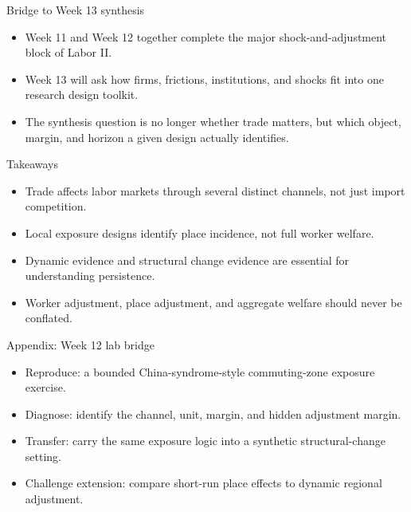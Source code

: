 \documentclass[aspectratio=169,11pt]{beamer}
\begin{document}
\begin{frame}{Bridge to Week 13 synthesis}
\begin{itemize}
    \item Week 11 and Week 12 together complete the major shock-and-adjustment block of Labor II.
    \item Week 13 will ask how firms, frictions, institutions, and shocks fit into one research design toolkit.
    \item The synthesis question is no longer whether trade matters, but which object, margin, and horizon a given design actually identifies.
\end{itemize}
\end{frame}

\begin{frame}{Takeaways}
\begin{itemize}
    \item Trade affects labor markets through several distinct channels, not just import competition.
    \item Local exposure designs identify place incidence, not full worker welfare.
    \item Dynamic evidence and structural change evidence are essential for understanding persistence.
    \item Worker adjustment, place adjustment, and aggregate welfare should never be conflated.
\end{itemize}
\end{frame}

\appendix

\begin{frame}{Appendix: Week 12 lab bridge}
\begin{itemize}
    \item Reproduce: a bounded China-syndrome-style commuting-zone exposure exercise.
    \item Diagnose: identify the channel, unit, margin, and hidden adjustment margin.
    \item Transfer: carry the same exposure logic into a synthetic structural-change setting.
    \item Challenge extension: compare short-run place effects to dynamic regional adjustment.
\end{itemize}
\end{frame}
\end{document}
